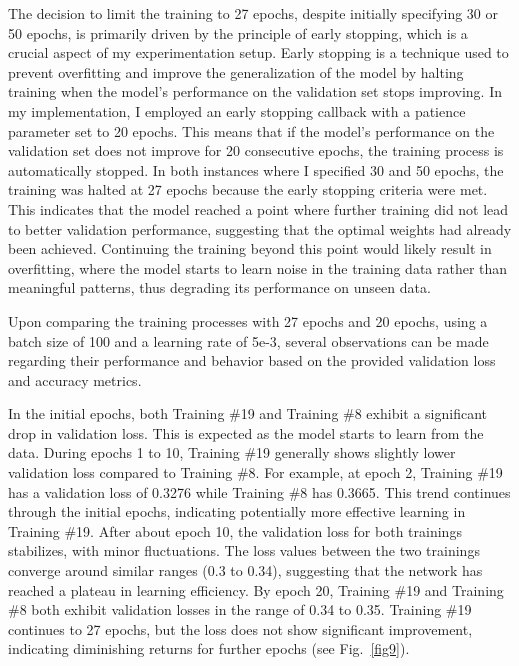 \documentclass[runningheads]{llncs}
\begin{document}
The decision to limit the training to 27 epochs, despite initially specifying 30 or 50 epochs, is primarily driven by the principle of early stopping, which is a crucial aspect of my experimentation setup. Early stopping is a technique used to prevent overfitting and improve the generalization of the model by halting training when the model's performance on the validation set stops improving. In my implementation, I employed an early stopping callback with a patience parameter set to 20 epochs. This means that if the model's performance on the validation set does not improve for 20 consecutive epochs, the training process is automatically stopped. In both instances where I specified 30 and 50 epochs, the training was halted at 27 epochs because the early stopping criteria were met. This indicates that the model reached a point where further training did not lead to better validation performance, suggesting that the optimal weights had already been achieved. Continuing the training beyond this point would likely result in overfitting, where the model starts to learn noise in the training data rather than meaningful patterns, thus degrading its performance on unseen data.

Upon comparing the training processes with 27 epochs and 20 epochs, using a batch size of 100 and a learning rate of 5e-3, several observations can be made regarding their performance and behavior based on the provided validation loss and accuracy metrics.

In the initial epochs, both Training \#19 and Training \#8 exhibit a significant drop in validation loss. This is expected as the model starts to learn from the data. During epochs 1 to 10, Training \#19 generally shows slightly lower validation loss compared to Training \#8. For example, at epoch 2, Training \#19 has a validation loss of 0.3276 while Training \#8 has 0.3665. This trend continues through the initial epochs, indicating potentially more effective learning in Training \#19. After about epoch 10, the validation loss for both trainings stabilizes, with minor fluctuations. The loss values between the two trainings converge around similar ranges (0.3 to 0.34), suggesting that the network has reached a plateau in learning efficiency. By epoch 20, Training \#19 and Training \#8 both exhibit validation losses in the range of 0.34 to 0.35. Training \#19 continues to 27 epochs, but the loss does not show significant improvement, indicating diminishing returns for further epochs (see Fig.~\ref{fig9}).
\end{document}
